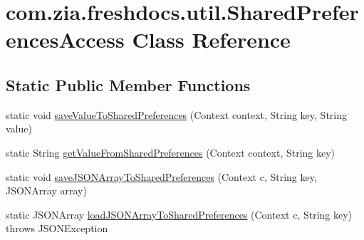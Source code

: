 \hypertarget{classcom_1_1zia_1_1freshdocs_1_1util_1_1_shared_preferences_access}{\section{com.\-zia.\-freshdocs.\-util.\-Shared\-Preferences\-Access Class Reference}
\label{classcom_1_1zia_1_1freshdocs_1_1util_1_1_shared_preferences_access}
}
\subsection*{Static Public Member Functions}
\begin{DoxyCompactItemize}
\item 
static void \hyperlink{classcom_1_1zia_1_1freshdocs_1_1util_1_1_shared_preferences_access_a9ed9dac6d7d29a254fe88a8eee9c100e}{save\-Value\-To\-Shared\-Preferences} (Context context, String key, String value)
\item 
static String \hyperlink{classcom_1_1zia_1_1freshdocs_1_1util_1_1_shared_preferences_access_a0e4a7940d768a2ca160e8df21b99d8f6}{get\-Value\-From\-Shared\-Preferences} (Context context, String key)
\item 
static void \hyperlink{classcom_1_1zia_1_1freshdocs_1_1util_1_1_shared_preferences_access_adbef17580a46cd6495de8c2101c4b3af}{save\-J\-S\-O\-N\-Array\-To\-Shared\-Preferences} (Context c, String key, J\-S\-O\-N\-Array array)
\item 
static J\-S\-O\-N\-Array \hyperlink{classcom_1_1zia_1_1freshdocs_1_1util_1_1_shared_preferences_access_a8318d9119678b8c32232cd5e8fc922c9}{load\-J\-S\-O\-N\-Array\-To\-Shared\-Preferences} (Context c, String key)  throws J\-S\-O\-N\-Exception 
\end{DoxyCompactItemize}


